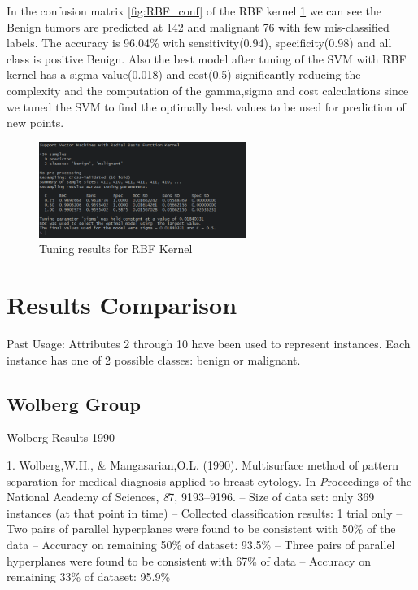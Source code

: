 \documentclass[conference]{IEEEtran}
\begin{document}
In the confusion matrix \ref{fig:RBF_conf} of the RBF kernel \ref{fig:RBF_ker} we can see the Benign tumors \cite{UCI} are predicted at 142 and malignant 76 with few mis-classified labels. The accuracy is 96.04\% with sensitivity(0.94), specificity(0.98) and all class is positive Benign. Also the best model after tuning of the SVM with RBF kernel has a sigma value(0.018) and cost(0.5) significantly reducing the complexity and the computation of the gamma,sigma and cost calculations since we tuned the SVM to find the optimally best values to be used for prediction of new points.

\begin{figure}[ht!]
\centering
\includegraphics[width=0.6\textwidth]{figs/after_tuning_radial.png}
\caption{Tuning results for RBF Kernel}
\label{fig:RBF_ker} 
\end{figure}

\section{Results Comparison}

Past Usage: Attributes 2 through 10 have been used to represent instances. Each instance has one of 2 possible classes: benign or malignant.

\subsection*{Wolberg Group} 
\begin{table}[h!]
\center
	\caption{Wolberg Results 1990}
\label{table:Wol_Results} \cite{wolberg}

   1. Wolberg,W.H., \& Mangasarian,O.L. (1990). Multisurface method of 
      pattern separation for medical diagnosis applied to breast cytology. In
      {\textit Proceedings of the National Academy of Sciences}, {\textit 87},
      9193--9196.
      -- Size of data set: only 369 instances (at that point in time)
      -- Collected classification results: 1 trial only
      -- Two pairs of parallel hyperplanes were found to be consistent with
         50\% of the data
         -- Accuracy on remaining 50\% of dataset: 93.5\%
      -- Three pairs of parallel hyperplanes were found to be consistent with
         67\% of data
         -- Accuracy on remaining 33\% of dataset: 95.9\%
\end{table}
\end{document}
